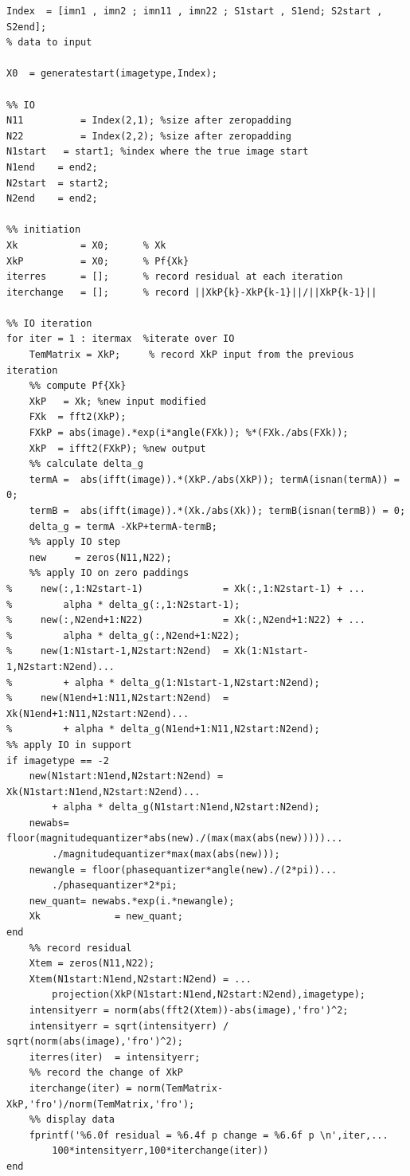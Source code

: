 \documentclass[letter,14pt]{extreport}
\begin{document}
\begin{appendices}
\begin{lstlisting}
Index  = [imn1 , imn2 ; imn11 , imn22 ; S1start , S1end; S2start , S2end];
% data to input

X0  = generatestart(imagetype,Index);

%% IO  
N11          = Index(2,1); %size after zeropadding
N22          = Index(2,2); %size after zeropadding
N1start   = start1; %index where the true image start
N1end    = end2;
N2start  = start2;
N2end    = end2;

%% initiation
Xk           = X0;      % Xk
XkP          = X0;      % Pf{Xk}
iterres      = [];      % record residual at each iteration
iterchange   = [];      % record ||XkP{k}-XkP{k-1}||/||XkP{k-1}||

%% IO iteration
for iter = 1 : itermax  %iterate over IO
    TemMatrix = XkP;     % record XkP input from the previous iteration
    %% compute Pf{Xk}
    XkP   = Xk; %new input modified
    FXk  = fft2(XkP);
    FXkP = abs(image).*exp(i*angle(FXk)); %*(FXk./abs(FXk));
    XkP  = ifft2(FXkP); %new output
    %% calculate delta_g
    termA =  abs(ifft(image)).*(XkP./abs(XkP)); termA(isnan(termA)) = 0;
    termB =  abs(ifft(image)).*(Xk./abs(Xk)); termB(isnan(termB)) = 0;
    delta_g = termA -XkP+termA-termB;
    %% apply IO step
    new     = zeros(N11,N22);
    %% apply IO on zero paddings
%     new(:,1:N2start-1)              = Xk(:,1:N2start-1) + ...
%         alpha * delta_g(:,1:N2start-1);
%     new(:,N2end+1:N22)              = Xk(:,N2end+1:N22) + ...
%         alpha * delta_g(:,N2end+1:N22);
%     new(1:N1start-1,N2start:N2end)  = Xk(1:N1start-1,N2start:N2end)...
%         + alpha * delta_g(1:N1start-1,N2start:N2end);
%     new(N1end+1:N11,N2start:N2end)  = Xk(N1end+1:N11,N2start:N2end)...
%         + alpha * delta_g(N1end+1:N11,N2start:N2end);
%% apply IO in support
if imagetype == -2
    new(N1start:N1end,N2start:N2end) = Xk(N1start:N1end,N2start:N2end)...
        + alpha * delta_g(N1start:N1end,N2start:N2end);
    newabs= floor(magnitudequantizer*abs(new)./(max(max(abs(new)))))...
        ./magnitudequantizer*max(max(abs(new)));
    newangle = floor(phasequantizer*angle(new)./(2*pi))...
        ./phasequantizer*2*pi;
    new_quant= newabs.*exp(i.*newangle);
    Xk             = new_quant;
end
    %% record residual
    Xtem = zeros(N11,N22);
    Xtem(N1start:N1end,N2start:N2end) = ...
        projection(XkP(N1start:N1end,N2start:N2end),imagetype);
    intensityerr = norm(abs(fft2(Xtem))-abs(image),'fro')^2;
    intensityerr = sqrt(intensityerr) / sqrt(norm(abs(image),'fro')^2);
    iterres(iter)  = intensityerr;
    %% record the change of XkP
    iterchange(iter) = norm(TemMatrix-XkP,'fro')/norm(TemMatrix,'fro');
    %% display data
    fprintf('%6.0f residual = %6.4f p change = %6.6f p \n',iter,...
        100*intensityerr,100*iterchange(iter))
end


\end{lstlisting}
\end{appendices}
\end{document}

